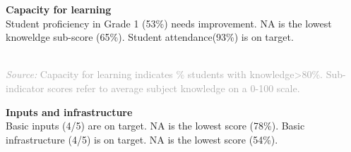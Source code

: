 \documentclass[twocolumn]{article}
\begin{document}
\textbf{Capacity for learning}\\
Student proficiency in Grade 1 (53\%) needs improvement. NA is the
lowest knoweldge sub-score (65\%). Student attendance(93\%) is on
target.

\begin{table}[H]
\\
{\scriptsize
    \textcolor{darkgray}{\textit{Source:} Capacity for learning indicates \% students with knowledge\textgreater{80\%}. Sub-indicator scores refer to average subject knowledge on a 0-100 scale.}
  }

\end{table}
\raggedbottom

\textbf{Inputs and infrastructure}\\
Basic inputs (4/5) are on target. NA is the lowest score (78\%). Basic
infrastructure (4/5) is on target. NA is the lowest score (54\%).
\end{document}
